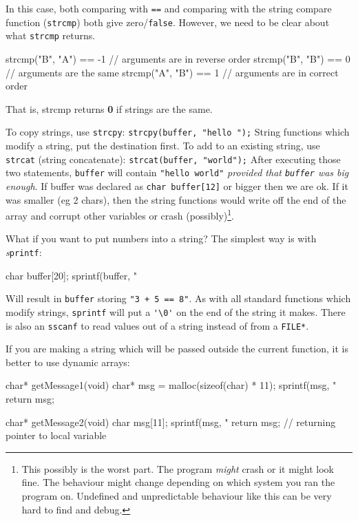In this case, both comparing with \texttt{==} and comparing with the string compare function (\texttt{strcmp}) both give zero/\lstinline!false!.
However, we need to be clear about what \texttt{strcmp} returns.
\begin{codeblock}
strcmp("B", "A") == -1 // arguments are in reverse order
strcmp("B", "B") == 0  // arguments are the same
strcmp("A", "B") == 1  // arguments are in correct order
\end{codeblock}
That is, strcmp returns \textbf{0} if strings are the same.

To copy strings, use \texttt{strcpy}:
\lstinline{strcpy(buffer, "hello ");}
String functions which modify a string, put the destination first.
To add to an existing string, use \texttt{strcat} (string concatenate):
\lstinline{strcat(buffer, "world");}
After executing those two statements, \texttt{buffer} will contain \lstinline!"hello world"! \emph{provided that \texttt{buffer} was big enough}.
If buffer was declared as \lstinline!char buffer[12]! or bigger then we are ok.
If it was smaller (eg 2 chars), then the string functions would write off the end of the array and corrupt other variables or crash (possibly)\footnote{This possibly is the worst part.
The program \emph{might} crash or it might look fine.
The behaviour might change depending on which system you ran the program on.
Undefined and unpredictable behaviour like this can be very hard to find and debug.}.

What if you want to put numbers into a string? 
The simplest way is with \emph{s}\texttt{printf}:
\begin{codeblock}
char buffer[20];
sprintf(buffer, "%
\end{codeblock}
Will result in \texttt{buffer} storing \lstinline!"3 + 5 == 8"!.
As with all standard functions which modify strings, \texttt{sprintf} will put a \lstinline!'\0'! on the end of the string it makes.
There is also an \texttt{sscanf} to read values out of a string instead of from a \texttt{FILE*}.

If you are making a string which will be passed outside the current function, it is better to use dynamic arrays:
\begin{codeblock}
char* getMessage1(void) {
    char* msg = malloc(sizeof(char) * 11);
    sprintf(msg, "%
    return msg;
}

char* getMessage2(void) {
    char msg[11];
    sprintf(msg, "%
    return msg;		// returning pointer to local variable
}
\end{codeblock}

